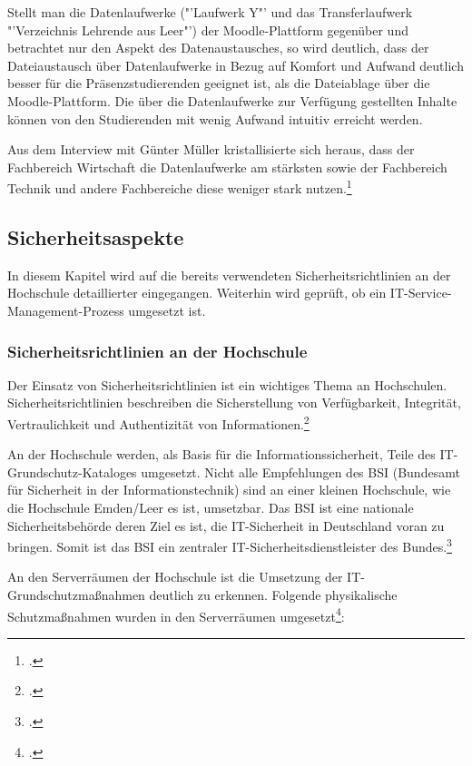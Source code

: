 Stellt man die Datenlaufwerke ("'Laufwerk Y"' und das Transferlaufwerk "'Verzeichnis Lehrende aus Leer"') der Moodle-Plattform gegenüber und betrachtet nur den Aspekt des Datenaustausches, so wird deutlich, dass der Dateiaustausch über Datenlaufwerke in Bezug auf Komfort und Aufwand deutlich besser für die Präsenzstudierenden geeignet ist, als die Dateiablage über die Moodle-Plattform. Die über die Datenlaufwerke zur Verfügung gestellten Inhalte können von den Studierenden mit wenig Aufwand intuitiv erreicht werden.

Aus dem Interview mit Günter Müller kristallisierte sich heraus, dass der Fachbereich Wirtschaft die Datenlaufwerke am stärksten sowie der Fachbereich Technik und andere Fachbereiche diese weniger stark nutzen.\footcite{gunter_muller_interview}

\subsection{Sicherheitsaspekte}
\label{subsection_sicherheitsaspekte}
In diesem Kapitel wird auf die bereits verwendeten Sicherheitsrichtlinien an der Hochschule detaillierter eingegangen. Weiterhin wird geprüft, ob ein IT-Service-Management-Prozess  umgesetzt ist.

\subsubsection{Sicherheitsrichtlinien an der Hochschule}
Der Einsatz von Sicherheitsrichtlinien ist ein wichtiges Thema an Hochschulen. Sicherheitsrichtlinien beschreiben die Sicherstellung von Verfügbarkeit, Integrität, Vertraulichkeit und Authentizität von Informationen.\footcite[Vgl.][]{sicherheitsrichtlinien_datenschutz-berlin.de_2008}

An der Hochschule werden, als Basis für die Informationssicherheit, Teile des IT-Grundschutz-Kataloges umgesetzt. Nicht alle Empfehlungen des BSI (Bundesamt für Sicherheit in der Informationstechnik) sind an einer kleinen Hochschule, wie die Hochschule Emden/Leer es ist,  umsetzbar. Das BSI ist eine nationale Sicherheitsbehörde deren Ziel es ist, die IT-Sicherheit in Deutschland voran zu bringen. Somit ist das BSI ein zentraler IT-Sicherheitsdienstleister des Bundes.\footcite[Vgl.][]{sicherheitsrichtlinien_bsi.bund.de_2015}

An den Serverräumen der Hochschule ist die Umsetzung der IT-Grundschutzmaßnahmen deutlich zu erkennen.
Folgende physikalische Schutzmaßnahmen wurden in den Serverräumen umgesetzt\footcite{gunter_muller_interview}:

